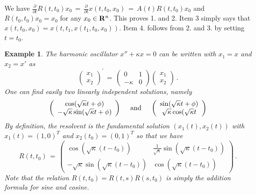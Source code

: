 \documentclass[12pt]{report}
\newcommand{\bR}{{\bf R}}
\newtheorem{example}[theorem]{Example}
\newcommand{\proof}{\noindent {\em Proof:~}}
\begin{document}
\proof We have $\frac{\partial}{\partial t}R(t,t_0)x_0\,=\, \frac{\partial}
{\partial t} x(t,t_0,
x_0)\,=\, A(t) R(t,t_0)x_0$ and $R(t_0,t_0)x_0=x_0$ for any $x_0 \in
\bR^n$. This proves 1. and 2.  Item 3 simply says that $x(t,t_0,x_0)=
x(t, t_1, x(t_1,t_0,x_0))$. Item 4. follows from 2. and 3. by setting
$t=t_0$.

 
\begin{example}\label{haos}{\rm  The harmonic oscillator 
$x''+ \kappa x =0$ can be written with $x_1=x$ and 
$x_2=x'$ as
\begin{equation} \label{oss}
\left( \begin{array}{cc} x_1 \\  x_2 \end{array}\right)^{'}\,=\, 
\left( \begin{array}{cc} 0 & 1  \\ -\kappa & 0 \end{array}\right)
\left( \begin{array}{cc} x_1 \\  x_2 \end{array}\right) \,.
\end{equation}
One can find easily two linearly independent solutions, namely 
\begin{equation} 
\left( \begin{array}{c} \cos(\sqrt{\kappa}t + \phi) \\ -\sqrt\kappa
\sin(\sqrt{\kappa} t +\phi) \end{array} \right) \quad {\rm ~and~}
\quad \left( \begin{array}{c} \sin(\sqrt{\kappa}t + \phi) \\
\sqrt\kappa \cos(\sqrt{\kappa} t \end{array}\right)
\end{equation} 
By definition, the resolvent is the fundamental solution $(x_1(t),
x_2(t))$ with $x_1(t)=(1,0)^T$ and $x_2(t_0)=(0,1)^T$ so that we have
\begin{equation} \label{reshar}
R(t,t_0)\,=\, \left( \begin{array}{cc} \cos(\sqrt{\kappa}(t-t_0)) & 
\frac{1}{\sqrt\kappa}\sin(\sqrt{\kappa}(t-t_0)) 
\\ -\sqrt{\kappa} \sin(\sqrt{\kappa}(t-t_0)) & \cos(\sqrt{\kappa}(t-t_0)) 
\end{array} \right) \,.
\end{equation}
Note that the relation $R(t,t_0) = R(t,s)R(s,t_0)$ is simply the
addition formula for sine and cosine.  }
\end{example}
\end{document}
